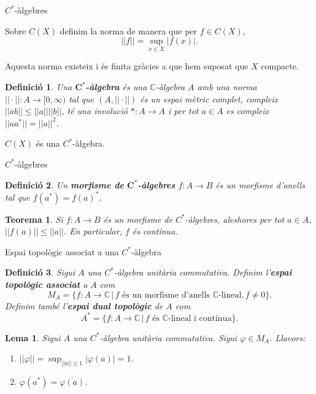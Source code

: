 \documentclass{beamer}
\newtheorem{teorema}{Teorema}
\newtheorem{lema}{Lema}
\newtheorem{definicio}{Definici\'{o}}
\theoremstyle{definition}
\begin{document}
\begin{frame}{$C^*$-\`{a}lgebres}

Sobre $C(X)$ definim la norma de manera que per $f\in C(X)$,
\[||f||=\sup_{x\in X}|f(x)|.\]

Aquesta norma existeix i \'{e}s finita gr\`{a}cies a que hem suposat que $X$ compacte.
\pause

\begin{definicio}
Una $\boldsymbol{C^*}$\textbf{-\`{a}lgebra} \'{e}s una $\mathbb{C}$-\`{a}lgebra $A$ amb una norma $||\cdot||:A\rightarrow[0,\infty)$ tal que $(A,||\cdot||)$ \'{e}s un espai m\`{e}tric complet, compleix $||ab||\leq||a||||b||$, t\'{e} una involuci\'{o} $*:A\rightarrow A$ i per tot $a\in A$ es compleix $||aa^*||=||a||^2$.
\end{definicio}
\pause

$C(X)$ \'{e}s una $C^*$-\`{a}lgebra.
\end{frame}

\begin{frame}{$C^*$-\`{a}lgebres}
\begin{definicio}
Un \textbf{morfisme de }$\boldsymbol{C^*}$\textbf{-\`{a}lgebres} $f:A\rightarrow B$ \'{e}s un morfisme d'anells tal que $f(a^*)=f(a)^*$.
\end{definicio}
\pause

\begin{teorema}
Si $f:A\rightarrow B$ \'{e}s un morfisme de $C^*$-\`{a}lgebres, aleshores per tot $a\in A$, $||f(a)||\leq||a||$. En particular, $f$ \'{e}s cont\'{i}nua.
\end{teorema}
\end{frame}

\begin{frame}{Espai topol\`{o}gic associat a una $C^*$-\`{a}lgebra}
\begin{definicio}
Sigui $A$ una $C^*$-\`{a}lgebra unit\`{a}ria commutativa. Definim l'\textbf{espai topol\`{o}gic associat} a $A$ com
\[M_A=\{f:A\rightarrow\mathbb{C}\,|\,f\text{ \'{e}s un morfisme d'anells }\mathbb{C}\text{-lineal},f\neq0\}.\]
\pause
Definim tamb\'{e} l'\textbf{espai dual topol\`{o}gic} de $A$ com
\[A^*=\{f:A\rightarrow\mathbb{C}\,|\,f\text{ \'{e}s }\mathbb{C}\text{-lineal i cont\'{i}nua}\}.\]
\end{definicio}
\pause

\begin{lema}
Sigui $A$ una $C^*$-\`{a}lgebra unit\`{a}ria commutativa. Sigui $\varphi\in M_A$. Llavors:
\begin{enumerate}
\item $\displaystyle{||\varphi||=\sup_{||a||\leq1}|\varphi(a)|=1}$.
\item $\varphi(a^*)=\overline{\varphi(a)}$.
\end{enumerate}
\end{lema}
\end{frame}
\end{document}
